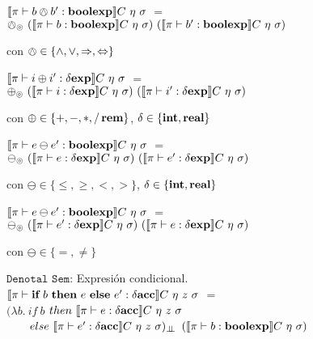 $\llbracket  \pi \vdash b \owedge b' : \textbf{boolexp}  \rrbracket C \ \eta \ \sigma$ 
$=$ \\
\indent \indent \indent \indent
$\owedge_{\circledcirc} \
(\llbracket \pi \vdash b : \textbf{boolexp} \rrbracket C \ \eta \ \sigma) \
(\llbracket \pi \vdash b' : \textbf{boolexp} \rrbracket C \ \eta \ \sigma)$

\begin{center}
con $\owedge \in \{ \wedge,\vee,\Rightarrow,\Leftrightarrow \}$
\end{center}

$\llbracket  \pi \vdash i \oplus i' : \delta \textbf{exp}  \rrbracket C \ \eta \ \sigma$ 
$=$ \\
\indent \indent \indent \indent
$\oplus_{\circledcirc} \
(\llbracket \pi \vdash i : \delta \textbf{exp} \rrbracket C \ \eta \ \sigma) \
(\llbracket \pi \vdash i' : \delta \textbf{exp} \rrbracket C \ \eta \ \sigma)$

\begin{center}
con $\oplus \in \{ +,-,*,/\,\textbf{rem} \}$, $\delta \in \{\textbf{int},\textbf{real}\}$
\end{center}

$\llbracket  \pi \vdash e \ominus e' : \textbf{boolexp}  \rrbracket C \ \eta \ \sigma$ 
$=$ \\
\indent \indent \indent \indent
$\ominus_{\circledcirc} \
(\llbracket \pi \vdash e : \delta \textbf{exp} \rrbracket C \ \eta \ \sigma) \
(\llbracket \pi \vdash e' : \delta \textbf{exp} \rrbracket C \ \eta \ \sigma)$

\begin{center}
con $\ominus \in \{\leq,\geq,<,> \}$, $\delta \in \{\textbf{int},\textbf{real}\}$
\end{center}

$\llbracket  \pi \vdash e \ominus e' : \textbf{boolexp}  \rrbracket C \ \eta \ \sigma$ 
$=$ \\
\indent \indent \indent \indent
$\ominus_{\circledcirc} \
(\llbracket \pi \vdash e' : \delta \textbf{exp} \rrbracket C \ \eta \ \sigma) \
(\llbracket \pi \vdash e : \delta \textbf{exp} \rrbracket C \ \eta \ \sigma)$

\begin{center}
con $\ominus \in \{=,\neq\}$
\end{center}

\noindent
$\texttt{Denotal Sem:}$ Expresi\'on condicional.\\

$\llbracket  \pi \vdash \textbf{if} \ b \ \textbf{then} \ e \ \textbf{else} \ e': \delta \textbf{acc} \rrbracket C \ \eta \ z \ \sigma$ 
$=$ \\
\indent \indent \indent 
$(\lambda b . \ if \ b $ $then \ \llbracket  \pi \vdash e : \delta \textbf{acc} \rrbracket C \ \eta \ z \ \sigma$\\
\indent \indent \indent \indent \indent \ \ \ \
$else \ \llbracket  \pi \vdash e' : \delta \textbf{acc} \rrbracket C \ \eta \ z \ \sigma)_{\bot \!\!\! \bot}$ 
$(\semBrcks{ \pi \vdash b : \boolexp}C \ \eta \ \sigma)$\\

